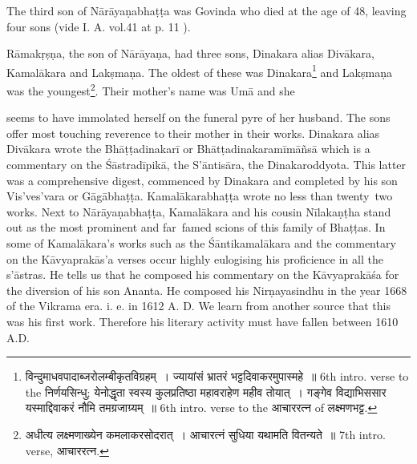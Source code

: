 \documentclass[11pt, openany]{book}
\begin{document}
The third son of Nārāyaṇabhaṭṭa was Govinda who died at the age of 48, leaving four sons (vide I. A. vol.41 at p. 11 ).

Rāmakṛṣṇa, the son of Nārāyaṇa, had three sons, Dinakara alias Divākara, Kamalākara and Lakṣmaṇa. The oldest of these was Dinakara\renewcommand{\thefootnote}{3}\footnote{विन्दुमाधवपादाब्जरोलम्बीकृतविग्रहम्~। ज्यायांसं भ्रातरं भट्टदिवाकरमुपास्महे~॥ 6th intro. verse to the निर्णयसिन्धु; येनोद्धृता स्वस्य कुलप्रतिष्ठा महावराहेण महीव तोयात्~। गङ्गेव विद्याभिससार यस्माद्दिवाकरं नौमि तमग्रजाग्र्यम्~॥ 6th intro. verse to the आचाररत्न of लक्ष्मणभट्ट.} and Lakṣmaṇa was the youngest\renewcommand{\thefootnote}{4}\footnote{अधीत्य लक्ष्मणाख्येन कमलाकरसोदरात्~। आचारत्नं सुधिया यथामति वितन्यते~॥ 7th intro. verse, आचाररत्न.}. Their mother's name was Umā and she

\newpage

\noindent
seems to have immolated herself on the funeral pyre of her husband. The sons offer most touching reverence to their mother in their works. Dinakara alias Divākara wrote the Bhāṭṭadinakarī or Bhātṭadinakaramīmāñsā which is a commentary on the Śāstradīpikā, the S'āntisāra, the Dinakaroddyota. This latter was a comprehensive digest, commenced by Dinakara and completed by his son Vis'ves'vara or Gāgābhaṭṭa. Kamalākarabhaṭṭa wrote no less than twenty\textendash\ two works. Next to Nārāyaṇabhaṭṭa, Kamalākara and his cousin Nīlakaṇṭha stand out as the most prominent and far\textendash\ famed scions of this family of Bhaṭṭas. In some of Kamalākara's works such as the Śāntikamalākara and the commentary on the Kāvyaprakās'a verses occur highly eulogising his proficience in all the s'āstras. He tells us that he composed his commentary on the Kāvyaprakāśa for the diversion of his son Ananta. He composed his Nirṇayasindhu in the year 1668 of the Vikrama era. i. e. in 1612 A. D. We learn from another source that this was his first work. Therefore his literary activity must have fallen between 1610 A.D.


\newpage
\end{document}
